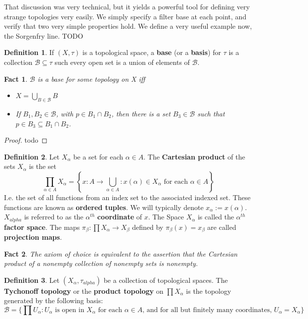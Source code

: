 \documentclass{article}
\theoremstyle{definition}
\newtheorem{definition}{Definition}[section]
\theoremstyle{plain}
\theoremstyle{theorem}
\newtheorem{fact}{Fact}[section]
\begin{document}
	That discussion was very technical, but it yields a powerful tool for defining very strange topologies very easily. We simply specify a filter base at each point, and verify that two very simple properties hold. We define a very useful example now, the Sorgenfry line. 
	TODO
	\begin{definition}
		If $(X,\tau)$ is a topological space, a \textbf{base} (or a \textbf{basis}) for $\tau$ is a collection $\mathcal{B} \subseteq \tau$ such every open set is a union of elements of $\mathcal{B}$. 
	\end{definition}
	\begin{fact}
		$\mathcal{B}$ is a base for \textit{some} topology on X iff 
		\begin{itemize}
			\item[(a)] $X = \bigcup_{B \in \mathcal{B}} B$
			\item[(b)] If $B_1,B_2 \in \mathcal{B}$, with $p \in B_1 \cap B_2$, then there is a set $B_3 \in \mathcal{B}$ such that $p \in B_3 \subseteq B_1 \cap B_2$.
		\end{itemize}
	\end{fact}
	\begin{proof}
		todo
	\end{proof}
	\begin{definition}
		Let $X_{\alpha}$ be a set for each $\alpha \in A$. The \textbf{Cartesian product} of the sets $X_{\alpha}$ is the set
		\[ \prod_{\alpha \in A} X_{\alpha} = \left\{ x: A \to \bigcup_{\alpha \in A}: x(\alpha) \in X_{\alpha} \textrm{ for each } \alpha \in A \right\} \]
		I.e. the set of all functions from an index set to the associated indexed set. These functions are known as \textbf{ordered tuples}. We will typically denote $x_{\alpha} := x(\alpha)$. $X_{alpha}$ is referred to as the $\alpha^{th}$ \textbf{coordinate} of $x$. The Space $X_{\alpha}$ is called the $\alpha^{th}$ \textbf{factor space}. The maps $\pi_{\beta}: \prod X_{\alpha} \to X_{\beta}$ defined by $\pi_{\beta}(x) = x_{\beta}$ are called \textbf{projection maps}.
	\end{definition}
	\begin{fact}
		The axiom of choice is equivalent to the assertion that the Cartesian product of a nonempty collection of nonempty sets is nonempty. 
	\end{fact}
	\begin{definition}
	Let $(X_{\alpha},\tau_{alpha})$ be a collection of topological spaces. The \textbf{Tychonoff topology} or the \textbf{product topology} on $\prod X_{\alpha}$ is the topology generated by the following basis:
	\[ \mathcal{B} = \{\prod U_{\alpha}: U_{\alpha} \textrm{ is open in $X_{\alpha}$ for each $\alpha \in A$, and for all but finitely many coordinates, $U_{\alpha} = X_{\alpha}$}\} \]
	\end{definition}
\end{document}
